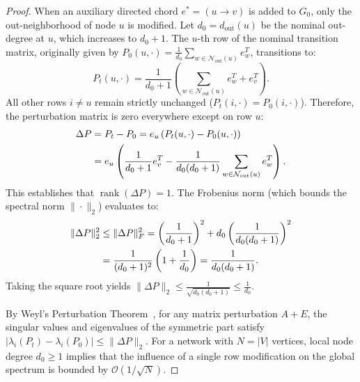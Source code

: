 \documentclass[11pt,a4paper]{article}
\begin{document}
\begin{proof}
When an auxiliary directed chord $e^* = (u \to v)$ is added to $G_0$, only the out-neighborhood of node $u$ is modified. Let $d_0 = d_{\text{out}}(u)$ be the nominal out-degree at $u$, which increases to $d_0 + 1$. The $u$-th row of the nominal transition matrix, originally given by $P_0(u, \cdot) = \frac{1}{d_0} \sum_{w \in \mathcal{N}_{\text{out}}(u)} e_w^T$, transitions to:
\begin{equation}
P_t(u, \cdot) = \frac{1}{d_0 + 1} \left( \sum_{w \in \mathcal{N}_{\text{out}}(u)} e_w^T + e_v^T \right).
\end{equation}
All other rows $i \ne u$ remain strictly unchanged ($P_t(i, \cdot) = P_0(i, \cdot)$). Therefore, the perturbation matrix is zero everywhere except on row $u$:
\begin{align}
\Delta P &= P_t - P_0 = e_u \left( P_t(u, \cdot) - P_0(u, \cdot) \right) \notag \\
&= e_u \left( \frac{1}{d_0 + 1} e_v^T - \frac{1}{d_0 (d_0 + 1)} \sum_{w \in \mathcal{N}_{\text{out}}(u)} e_w^T \right).
\end{align}
This establishes that $\operatorname{rank}(\Delta P) = 1$. The Frobenius norm (which bounds the spectral norm $\|\cdot\|_2$) evaluates to:
\begin{align}
\|\Delta P\|_2^2 &\le \|\Delta P\|_F^2 = \left( \frac{1}{d_0 + 1} \right)^2 + d_0 \left( \frac{1}{d_0 (d_0 + 1)} \right)^2 \notag \\
&= \frac{1}{(d_0 + 1)^2} \left( 1 + \frac{1}{d_0} \right) = \frac{1}{d_0 (d_0 + 1)}.
\end{align}
Taking the square root yields $\|\Delta P\|_2 \le \frac{1}{\sqrt{d_0 (d_0 + 1)}} \le \frac{1}{d_0}$.

By Weyl's Perturbation Theorem~\cite{bhatia1997matrix, weyl1912asymptotische}, for any matrix perturbation $A + E$, the singular values and eigenvalues of the symmetric part satisfy $|\lambda_i(P_t) - \lambda_i(P_0)| \le \|\Delta P\|_2$. For a network with $N = |V|$ vertices, local node degree $d_0 \ge 1$ implies that the influence of a single row modification on the global spectrum is bounded by $\mathcal{O}(1/\sqrt{N})$.


\end{proof}
\end{document}
